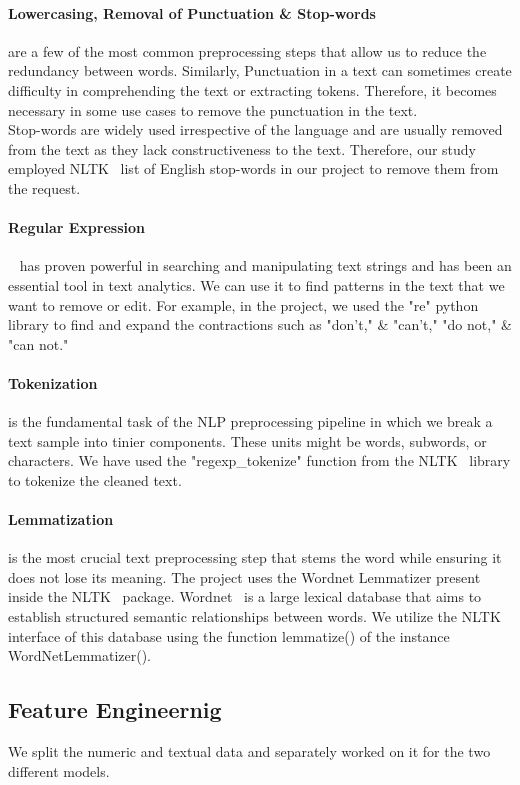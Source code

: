\documentclass[runningheads]{llncs}
\begin{document}
\paragraph{Lowercasing, Removal of Punctuation \& Stop-words}
are a few of the most common preprocessing steps that allow us to reduce the redundancy between words. Similarly, Punctuation in a text can sometimes create difficulty in comprehending the text or extracting tokens. Therefore, it becomes necessary in some use cases to remove the punctuation in the text.\\
Stop-words are widely used irrespective of the language and are usually removed from the text as they lack constructiveness to the text. Therefore, our study employed NLTK~\cite{nltk} list of English stop-words in our project to remove them from the request.
\paragraph{Regular Expression}~\cite{regex} has proven powerful in searching and manipulating text strings and has been an essential tool in text analytics. We can use it to find patterns in the text that we want to remove or edit. For example, in the project, we used the "re" python library to find and expand the contractions such as "don't," \& "can't," "do not," \& "can not."
\paragraph{Tokenization} is the fundamental task of the NLP preprocessing pipeline in which we break a text sample into tinier components. These units might be words, subwords, or characters. We have used the "regexp\_tokenize" function from the NLTK~\cite{nltk} library to tokenize the cleaned text.
\paragraph{Lemmatization} is the most crucial text preprocessing step that stems the word while ensuring it does not lose its meaning. The project uses the Wordnet Lemmatizer present inside the NLTK~\cite{nltk} package. Wordnet~\cite{wordnet} is a large lexical database that aims to establish structured semantic relationships between words. We utilize the NLTK~\cite{nltk} interface of this database using the function lemmatize() of the instance WordNetLemmatizer().

\subsection{Feature Engineernig}
We split the numeric and textual data and separately worked on it for the two different models.
\end{document}
